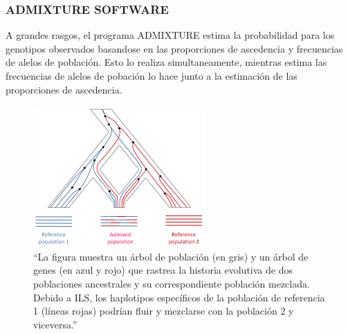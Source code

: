 \documentclass[serif,9pt]{beamer}
\theoremstyle{definition}
\theoremstyle{remark}
\begin{document}
\begin{frame}\frametitle{ADMIXTURE SOFTWARE}
  
  A grandes rasgos, el programa ADMIXTURE estima la probabilidad para los genotipos observados basandose en las proporciones de ascedencia y frecuencias de alelos de poblaci\'on. Esto lo realiza simultaneamente, mientras estima las frecuencias de alelos de pobaci\'on lo hace junto a la estimaci\'on de las proporciones de ascedencia.\linebreak

  \begin{figure}[H]
  \centering
  \includegraphics[scale=0.5]{images.png}
  \caption{ ``La figura muestra un árbol de población (en gris) y un árbol de genes (en azul y rojo) que rastrea la historia evolutiva de dos poblaciones ancestrales y su correspondiente población mezclada. Debido a ILS, los haplotipos específicos de la población de referencia 1 (líneas rojas) podrían fluir y mezclarse con la población 2 y viceversa.''  \cite{Yuan}}
  \label{fig:adm}
  \end{figure}
\end{frame}
  
\end{document}
